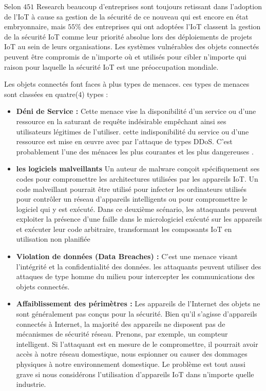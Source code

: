 Selon $451$ Research \citep{ref451rec} beaucoup d'entreprises sont toujours retissant dans l'adoption de l'IoT à cause sa gestion de la sécurité de ce nouveau qui est encore en état embryonnaire, mais $55\%$ des entreprises qui ont adoptées l'IoT classent la gestion de la sécurité IoT comme leur priorité absolue lors des déploiements de projets IoT au sein de leurs organisations. Les systèmes vulnérables des objets connectés  peuvent être compromis de n’importe où et utilisés pour cibler n’importe qui raison pour laquelle la sécurité IoT est une préoccupation mondiale.

{\green Les objets connectés font faces à plus types de menaces. ces types de menaces sont classées en quatre($4$) types \citep{refinfosec} : 
\begin{itemize}
\item \textbf{Déni de Service :} Cette menace vise la disponibilité d'un service ou d'une ressource en la saturant de requête indésirable empêchant ainsi ses utilisateurs légitimes de l'utiliser. cette indisponibilité du service ou d'une ressource est mise en œuvre avec par l'attaque de types DDoS. C'est probablement l'une des ménaces les plus courantes et les plus dangereuses . 
\item \textbf{les logiciels malveillants} Un auteur de malware conçoit spécifiquement ses codes pour compromettre les architectures utilisées par les appareils IoT. Un code malveillant pourrait être utilisé pour infecter les ordinateurs utilisés pour contrôler un réseau d'appareils intelligents ou pour compromettre le logiciel qui y est exécuté. Dans ce deuxième scénario, les attaquants peuvent exploiter la présence d'une faille dans le micrologiciel exécuté sur les appareils et exécuter leur code arbitraire, transformant les composants IoT en utilisation non planifiée \citep{refinfosec}
\item \textbf{Violation de données (Data Breaches) : } C'est une menace visant l'intégrité et la confidentialité des données. les attaquants peuvent utiliser des attaques de type homme du milieu pour intercepter les communications des objets connectés.  
\item \textbf{Affaiblissement des périmètres : } Les appareils de l'Internet des objets ne sont généralement pas conçus pour la sécurité. Bien qu'il s'agisse d'appareils connectés à Internet, la majorité des appareils ne disposent pas de mécanismes de sécurité réseau. Prenons, par exemple, un compteur intelligent. Si l'attaquant est en mesure de le compromettre, il pourrait avoir accès à notre réseau domestique, nous espionner ou causer des dommages physiques à notre environnement domestique. Le problème est tout aussi grave si nous considérons l'utilisation d'appareils IoT dans n'importe quelle industrie.\citep{refinfosec}
\end{itemize}
}
